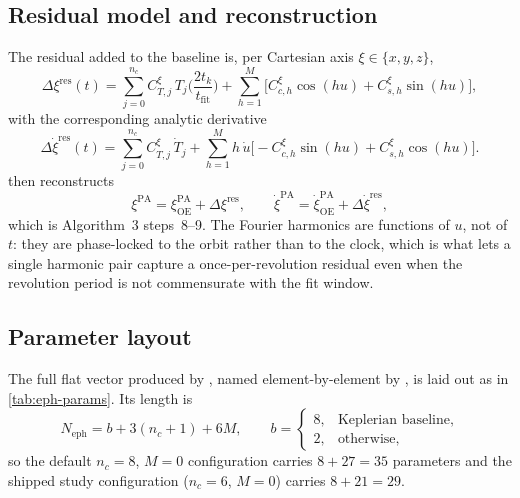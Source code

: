 \subsection{Residual model and reconstruction}

The residual added to the baseline is, per Cartesian axis
$\xi \in \{x, y, z\}$,
\begin{equation}
  \label{eq:eph-residual}
  \Delta\xi^\mathrm{res}(t)
  = \sum_{j=0}^{n_c} C^{\xi}_{T,j}\, T_j\!\Big(\frac{2t_k}{t_\mathrm{fit}}\Big)
  + \sum_{h=1}^{M}\Big[C^{\xi}_{c,h}\cos(h u) + C^{\xi}_{s,h}\sin(h u)\Big],
\end{equation}
with the corresponding analytic derivative
\begin{equation}
  \label{eq:eph-residual-dot}
  \Delta\dot\xi^\mathrm{res}(t)
  = \sum_{j=0}^{n_c} C^{\xi}_{T,j}\,\dot T_j
  + \sum_{h=1}^{M} h\,\dot u\Big[-C^{\xi}_{c,h}\sin(h u) + C^{\xi}_{s,h}\cos(h u)\Big].
\end{equation}
 then reconstructs
\begin{equation}
  \label{eq:eph-reconstruct}
  \xi^\mathrm{PA} = \xi^\mathrm{PA}_\mathrm{OE} + \Delta\xi^\mathrm{res},
  \qquad
  \dot\xi^\mathrm{PA} = \dot\xi^\mathrm{PA}_\mathrm{OE} + \Delta\dot\xi^\mathrm{res},
\end{equation}
which is Algorithm~3 steps~8--9. The Fourier harmonics are functions of $u$,
not of $t$: they are phase-locked to the orbit rather than to the clock, which
is what lets a single harmonic pair capture a once-per-revolution residual
even when the revolution period is not commensurate with the fit window.

\subsection{Parameter layout}

The full flat vector produced by , named element-by-element by
, is laid out as in \cref{tab:eph-params}. Its length is
\begin{equation}
  \label{eq:eph-numparams}
  N_\mathrm{eph} = b + 3(n_c + 1) + 6M,
  \qquad
  b = \begin{cases} 8, & \text{Keplerian baseline},\\ 2, & \text{otherwise},\end{cases}
\end{equation}
so the default $n_c = 8$, $M = 0$ configuration carries
$8 + 27 = 35$ parameters and the shipped study configuration
($n_c = 6$, $M = 0$) carries $8 + 21 = 29$.

